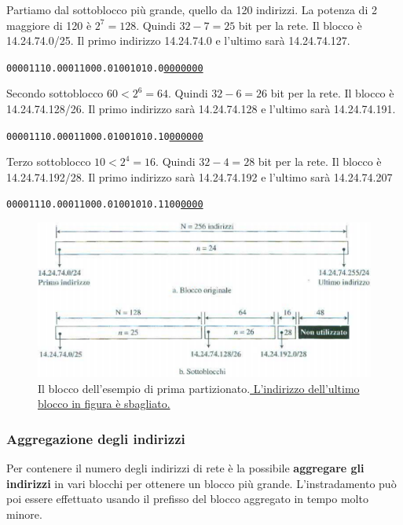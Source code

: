 \documentclass[11pt,a4paper,oneside]{book}
\theoremstyle{definition}
\begin{document}
Partiamo dal sottoblocco più grande, quello da 120 indirizzi. La potenza di 2 maggiore di 120 è $2^{7} = 128$. Quindi $32 - 7 = 25$ bit per la rete. Il blocco è 14.24.74.0/25.	Il primo indirizzo 14.24.74.0 e l'ultimo sarà 14.24.74.127.
\begin{alltt}
	00001110.00011000.01001010.0\underline{0000000}
\end{alltt}
Secondo sottoblocco $60 < 2^{6} = 64$. Quindi $32 - 6 = 26$ bit per la rete. Il blocco è 14.24.74.128/26. Il primo indirizzo sarà 14.24.74.128 e l'ultimo sarà 14.24.74.191.
\begin{alltt}
	00001110.00011000.01001010.10\underline{000000}
\end{alltt}
Terzo sottoblocco $10 < 2^{4} = 16$. Quindi $32 - 4 = 28$ bit per la rete. Il blocco è 14.24.74.192/28. Il primo indirizzo sarà 14.24.74.192 e l'ultimo sarà 14.24.74.207
\begin{alltt}
	00001110.00011000.01001010.1100\underline{0000}
\end{alltt}

\pagebreak

\begin{figure}[!h]
	\includegraphics[scale=0.3]{Immagini/Ip_es.png}
	\centering
	\caption{Il blocco dell'esempio di prima partizionato.\newline\small{\underline{ L'indirizzo dell'ultimo blocco in figura è sbagliato.}}}
\end{figure}

\subsubsection{Aggregazione degli indirizzi}
Per contenere il numero degli indirizzi di rete è la possibile \textbf{aggregare gli indirizzi} in vari blocchi per ottenere un blocco più grande. L'instradamento può poi essere effettuato usando il prefisso del blocco aggregato in tempo molto minore.
\end{document}
